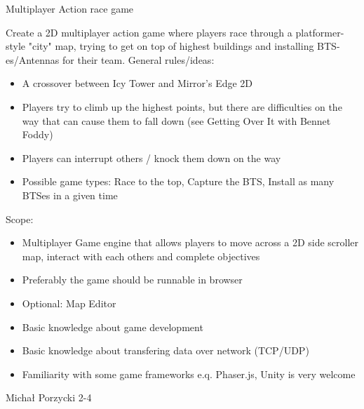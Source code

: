 \begin{project}
{Multiplayer Action race game}
{
Create a 2D multiplayer action game where players race through a platformer-style "city" map, trying to get on top of highest buildings and installing BTS-es/Antennas for their team. General rules/ideas:
\begin{itemize}
	\item A crossover between Icy Tower and Mirror's Edge 2D
	\item Players try to climb up the highest points, but there are difficulties on the way that can cause them to fall down (see Getting Over It with Bennet Foddy)
	\item Players can interrupt others / knock them down on the way
	\item Possible game types: Race to the top, Capture the BTS, Install as many BTSes in a given time
\end{itemize}
}
{
Scope:
\begin{itemize}
	\item Multiplayer Game engine that allows players to move across a 2D side scroller map, interact with each others and complete objectives
	\item Preferably the game should be runnable in browser
	\item Optional: Map Editor
\end{itemize}
}
{
\begin{itemize}
	\item Basic knowledge about game development
	\item Basic knowledge about transfering data over network (TCP/UDP)
	\item Familiarity with some game frameworks e.q. Phaser.js, Unity is very welcome
\end{itemize}
}
{Michał Porzycki}
{2-4}
\end{project}
